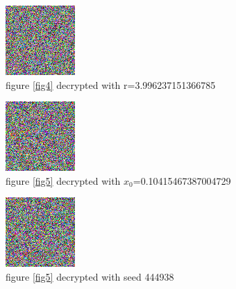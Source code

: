 \documentclass[10pt]{article}
\begin{document}
	
	\begin{figure}[htbp]
		\centering
		\includegraphics[width=0.5\columnwidth]{LMapStreamDinoDecrypted2.png}
		\caption{figure \ref{fig4} decrypted with r=3.996237151366785 }
		\label{fig7}
	\end{figure}


	\begin{figure}[htbp]
		\centering
		\includegraphics[width=0.5\columnwidth]{HenonDinoDecrypted2.png}
		\caption{figure \ref{fig5} decrypted with  $x_0$=0.10415467387004729}
		\label{fig8}
	\end{figure}

	\begin{figure}[htbp]
		\centering
		\includegraphics[width=0.5\columnwidth]{SimpleDinoDecrypted2.png}
		\caption{figure \ref{fig5} decrypted with seed 444938}
		\label{fig9}
	\end{figure}
\end{document}
